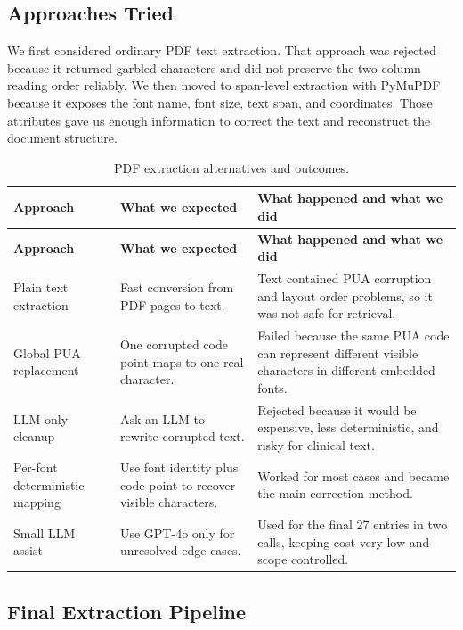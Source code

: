 \subsection{Approaches Tried}

We first considered ordinary PDF text extraction. That approach was rejected because it returned garbled characters and did not preserve the two-column reading order reliably. We then moved to span-level extraction with PyMuPDF because it exposes the font name, font size, text span, and coordinates. Those attributes gave us enough information to correct the text and reconstruct the document structure.

\begin{longtable}{p{} p{} p{}}
\caption{PDF extraction alternatives and outcomes.}
\label{tab:pdf_extraction_alternatives}\\
\toprule
\textbf{Approach} & \textbf{What we expected} & \textbf{What happened and what we did}\\
\midrule
\endfirsthead
\toprule
\textbf{Approach} & \textbf{What we expected} & \textbf{What happened and what we did}\\
\midrule
\endhead
Plain text extraction & Fast conversion from PDF pages to text. & Text contained PUA corruption and layout order problems, so it was not safe for retrieval.\\
Global PUA replacement & One corrupted code point maps to one real character. & Failed because the same PUA code can represent different visible characters in different embedded fonts.\\
LLM-only cleanup & Ask an LLM to rewrite corrupted text. & Rejected because it would be expensive, less deterministic, and risky for clinical text.\\
Per-font deterministic mapping & Use font identity plus code point to recover visible characters. & Worked for most cases and became the main correction method.\\
Small LLM assist & Use GPT-4o only for unresolved edge cases. & Used for the final 27 entries in two calls, keeping cost very low and scope controlled.\\
\bottomrule
\end{longtable}

\subsection{Final Extraction Pipeline}

